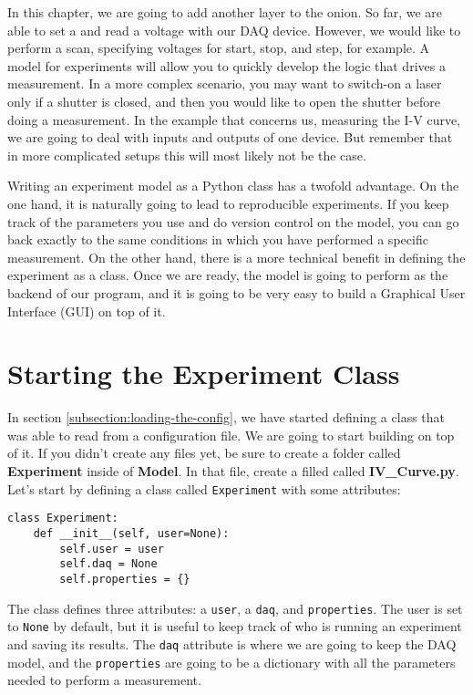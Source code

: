 In this chapter, we are going to add another layer to the onion. So far, we are able to set a and read a voltage with our DAQ device. However, we would like to perform a scan, specifying voltages for start, stop, and step, for example. A model for experiments will allow you to quickly develop the logic that drives a measurement. In a more complex scenario, you may want to switch-on a laser only if a shutter is closed, and then you would like to open the shutter before doing a measurement. In the example that concerns us, measuring the  I-V curve, we are going to deal with inputs and outputs of one device. But remember that in more complicated setups this will most likely not be the case.

Writing an experiment model as a Python class has a twofold advantage. On the one hand, it is naturally going to lead to reproducible experiments. If you keep track of the parameters you use and do version control on the model, you can go back exactly to the same conditions in which you have performed a specific measurement. On the other hand, there is a more technical benefit in defining the experiment as a class. Once we are ready, the model is going to perform as the backend of our program, and it is going to be very easy to build a Graphical User Interface ({GUI}) on top of it.

\section{Starting the Experiment Class}\label{starting-the-experimentclass}
In section \ref{subsection:loading-the-config}, we have started defining a class that was able to read from a configuration file. We are going to start building on top of it. If you didn't create any files yet, be sure to create a folder called \textbf{Experiment} inside of \textbf{Model}. In that file, create a filled called  \textbf{IV\_Curve.py}. Let's start by defining a class called \texttt{Experiment} with some attributes: 

\begin{verbatim}
class Experiment:
    def __init__(self, user=None):
        self.user = user
        self.daq = None
        self.properties = {}
\end{verbatim}

The class defines three attributes: a \texttt{user}, a \texttt{daq}, and \texttt{properties}. The user is set to \texttt{None} by default, but it is useful to keep track of who is running an experiment and saving its results. The \texttt{daq} attribute is where we are going to keep the DAQ model, and the \texttt{properties} are going to be a dictionary with all the parameters needed to perform a measurement. 

